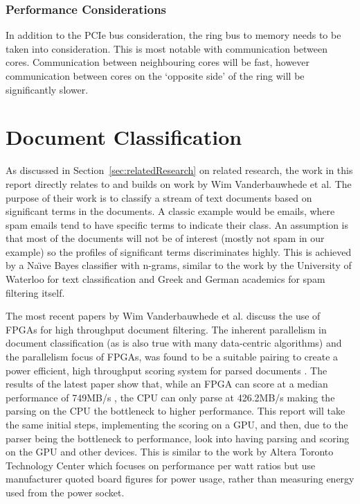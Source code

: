 \subsubsection{Performance Considerations}

In addition to the PCIe bus consideration, the ring bus to memory needs to be
taken into consideration. This is most notable with communication between cores.
Communication between neighbouring cores will be fast, however communication
between cores on the `opposite side' of the ring will be significantly slower.

\section{Document Classification}

As discussed in Section~\ref{sec:relatedResearch} on related research, the work
in this report directly relates to and builds on work by Wim Vanderbauwhede et
al. The purpose of their work is to classify a stream of text documents based on
significant terms in the documents. A classic example would be emails, where
spam emails tend to have specific terms to indicate their class. An assumption
is that most of the documents will not be of interest (mostly not spam in our
example) so the profiles of significant terms discriminates highly. This is
achieved by a Na{\"{\i}}ve Bayes classifier with n-grams, similar to the work by
the University of Waterloo \cite{peng2003combining} for text classification and
Greek \cite{metsis2006spam} and German \cite{Schneider:2003:CEM:1067807.1067848}
academics for spam filtering itself.

The most recent papers by Wim Vanderbauwhede et al. discuss the use of FPGAs for
high throughput document filtering. The inherent parallelism in document
classification (as is also true with many data-centric algorithms) and the
parallelism focus of FPGAs, was found to be a suitable pairing to create a power
efficient, high throughput scoring system for parsed documents
\cite{vanderbauwhede2013high} \cite{HybridCPUFPGA}. The results of the latest
paper show that, while an FPGA can score at a median performance of 749MB/s
\cite{vanderbauwhede2013high}, the CPU can only parse at 426.2MB/s making the
parsing on the CPU the bottleneck to higher performance. This report will take
the same initial steps, implementing the scoring on a GPU, and then, due to the
parser being the bottleneck to performance, look into having parsing and scoring
on the GPU and other devices. This is similar to the work by Altera Toronto
Technology Center which focuses on performance per watt ratios
\cite{chen2012invited} but use manufacturer quoted board figures for power
usage, rather than measuring energy used from the power socket.

